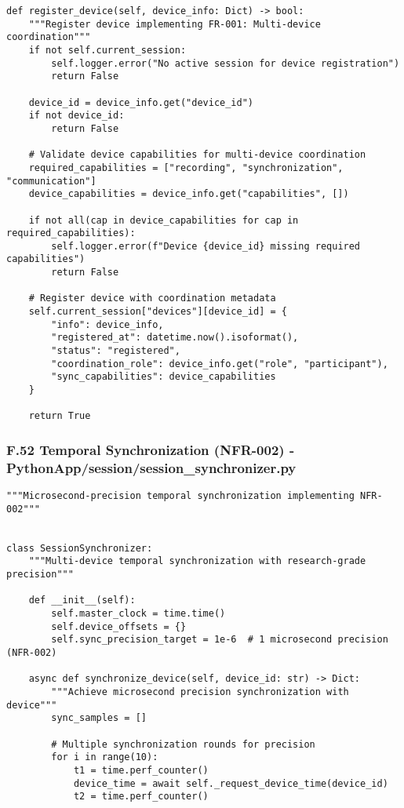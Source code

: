 \documentclass[12pt,a4paper]{report}
\begin{document}
{{\begin{verbatim}
def register_device(self, device_info: Dict) -> bool:
    """Register device implementing FR-001: Multi-device coordination"""
    if not self.current_session:
        self.logger.error("No active session for device registration")
        return False

    device_id = device_info.get("device_id")
    if not device_id:
        return False

    # Validate device capabilities for multi-device coordination
    required_capabilities = ["recording", "synchronization", "communication"]
    device_capabilities = device_info.get("capabilities", [])

    if not all(cap in device_capabilities for cap in required_capabilities):
        self.logger.error(f"Device {device_id} missing required capabilities")
        return False

    # Register device with coordination metadata
    self.current_session["devices"][device_id] = {
        "info": device_info,
        "registered_at": datetime.now().isoformat(),
        "status": "registered",
        "coordination_role": device_info.get("role", "participant"),
        "sync_capabilities": device_capabilities
    }

    return True
\end{verbatim}

\subsubsection{F.52 Temporal Synchronization (NFR-002) - PythonApp/session/session_synchronizer.py}

\begin{verbatim}
"""Microsecond-precision temporal synchronization implementing NFR-002"""


class SessionSynchronizer:
    """Multi-device temporal synchronization with research-grade precision"""

    def __init__(self):
        self.master_clock = time.time()
        self.device_offsets = {}
        self.sync_precision_target = 1e-6  # 1 microsecond precision (NFR-002)

    async def synchronize_device(self, device_id: str) -> Dict:
        """Achieve microsecond precision synchronization with device"""
        sync_samples = []

        # Multiple synchronization rounds for precision
        for i in range(10):
            t1 = time.perf_counter()
            device_time = await self._request_device_time(device_id)
            t2 = time.perf_counter()


\end{verbatim}}}
\end{document}
